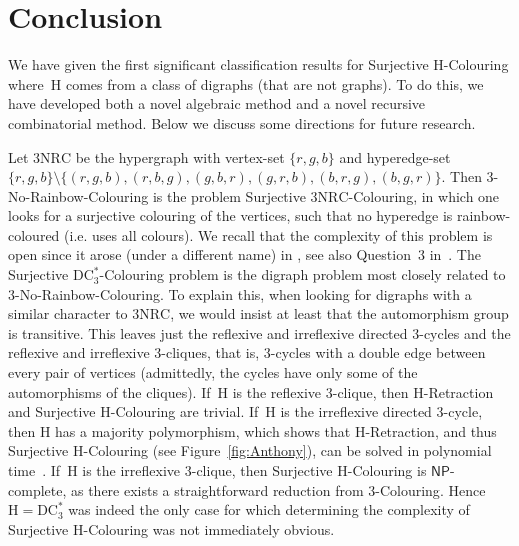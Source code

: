 \documentclass[a4paper,12pt]{article}
\theoremstyle{remark}
\newcommand{\NP}[0]{\ensuremath{\mathsf{NP}}}
\newcommand{\DC}[0]{\ensuremath{\mathrm{DC}}}
\renewcommand{\H}{\ensuremath{\mathrm{H}}}
\begin{document}
\section{Conclusion}\label{s-con}

We have given the first significant classification results for {\sc Surjective $\H$-Colouring} where~$\H$ comes from a class of digraphs (that are not graphs). 
To do this, we have developed both a novel algebraic method and a novel recursive combinatorial method. Below we discuss some directions for future research.

Let $3\mathrm{NRC}$ be the hypergraph with vertex-set $\{r,g,b\}$ and hyperedge-set $\{r,g,b\}\setminus\{(r,g,b),(r,b,g),(g,b,r),(g,r,b),(b,r,g),(b,g,r)\}$. Then {\sc $3$-No-Rainbow-Colouring} is the problem {\sc Surjective $3\mathrm{NRC}$-Colouring}, in which one looks for a surjective colouring of the vertices, such that no hyperedge is rainbow-coloured (\mbox{i.e.} uses all colours). 
We recall that the complexity of this problem is open since it arose (under a different name) in \cite{ColoringMixedHypertrees}, see also Question~3 in~\cite{SurHomSurvey}.
The {\sc Surjective $\DC^*_3$-Colouring} problem is the digraph problem most closely related to {\sc $3$-No-Rainbow-Colouring}. To explain this, 
when looking for digraphs with a similar character to $3\mathrm{NRC}$, we would insist at least that the automorphism group is transitive. This leaves just the reflexive and irreflexive directed $3$-cycles and the reflexive and irreflexive 3-cliques, that is, $3$-cycles with a double edge between every pair of vertices (admittedly, the cycles have only some of the automorphisms of the cliques). 
If~$\H$ is the reflexive $3$-clique, then $\H$-{\sc Retraction} and {\sc Surjective $\H$-Colouring} are trivial. 
If~$\H$ is the irreflexive directed $3$-cycle, then $\H$ has a majority polymorphism, which shows that $\H$-{\sc Retraction}, and thus {\sc Surjective $\H$-Colouring} (see Figure~\ref{fig:Anthony}),
can be solved in polynomial time~\cite{Semicomplete}. 
If~$\H$ is the irreflexive $3$-clique, then {\sc Surjective $\H$-Colouring} is \NP-complete, as there exists a straightforward reduction from 3-{\sc Colouring}.
Hence~$\H=\DC^*_3$ was indeed the only case for which determining the complexity of {\sc Surjective $\H$-Colouring} was not immediately obvious. 
\end{document}
